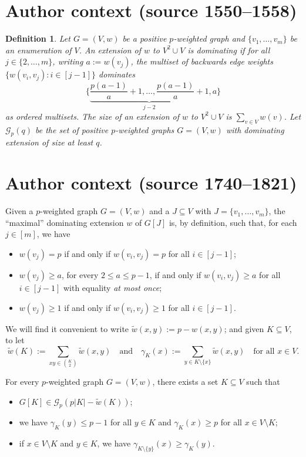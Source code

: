 \documentclass[10pt,a4paper]{amsart}
\newcommand{\cG}{\mathcal{G}}
\newtheorem{definition}{Definition}
\begin{document}
\section*{Author context (source 1550--1558)}
\begin{definition}
	Let $G=(V,w)$ be a positive $p$-weighted graph and $\lbrace v_1,\ldots,v_m\rbrace$ be an enumeration of $V$. An extension of $w$ to $V^2 \cup V$ is \emph{dominating} if  for all $j \in \{2,\ldots,m\}$, writing $a:=w(v_j)$, the multiset of backwards edge weights $\lbrace w(v_i,v_j) : i \in [j-1]\rbrace$ dominates
	$$
	\Big\lbrace \underbrace{\textstyle{\frac{p(a-1)}{a}+1,\ldots,\frac{p(a-1)}{a}+1}}_{j-2}, a\Big\rbrace
	$$
	as ordered multisets.
	The \emph{size} of an extension of $w$ to $V^2 \cup V$ is $\sum_{v \in V}w(v)$. 
	Let $\mathcal{G}_p(q)$ be the set of positive $p$-weighted graphs $G=(V,w)$ with dominating extension of size at least $q$.
\end{definition}

\section*{Author context (source 1740--1821)}
Given a $p$-weighted graph $G=(V,w)$ and a $J \subseteq V$ with $J = \{v_1,\ldots,v_m\}$,
the ``maximal'' dominating extension $w$ of $G[J]$ is, by definition, such that,
for each $j\in [m]$, we have
\begin{itemize}
	\item $w(v_j) = p$ if and only if $w(v_i,v_j) = p$ for all $i \in [j-1]$;
	\item $w(v_j) \geq a$, for every $2\le a\le p-1$, if and only if $w(v_i,v_j)\geq a$ for all $i \in [j-1]$ with equality \emph{at most once};
	\item $w(v_j)\geq 1$ if and only if $w(v_i,v_j) \geq 1$ for all $i \in [j-1]$.
\end{itemize}

We will find it convenient to write $\tilde{w}(x,y) := p - w(x,y)$; and given $K \subseteq V$, to let
$$
\tilde{w}(K) := \sum_{xy \in \binom{K}{2}}\tilde{w}(x,y)\quad\text{and}\quad \gamma_K(x) := \sum_{y \in K\setminus\{x\}}\tilde{w}(x,y)\quad\text{for all }x \in V.
$$

\begin{proposition}\label{prop-hero}
	For every $p$-weighted graph $G=(V,w)$, there exists a set $K \subseteq V$ such that
	\begin{itemize}
	\item[(i)] $G[K] \in \cG_p(p|K|-\tilde{w}(K))$;
	\item[(ii)] we have $\gamma_K(y) \leq p-1$ for all $y \in K$ and $\gamma_K(x) \geq p$ for all $x \in V\setminus K$;
	\item[(iii)] if $x \in V\setminus K$ and $y \in K$, we have $\gamma_{K\setminus\{y\}}(x) \geq \gamma_K(y)$.
	\end{itemize}
\end{proposition}
\end{document}
